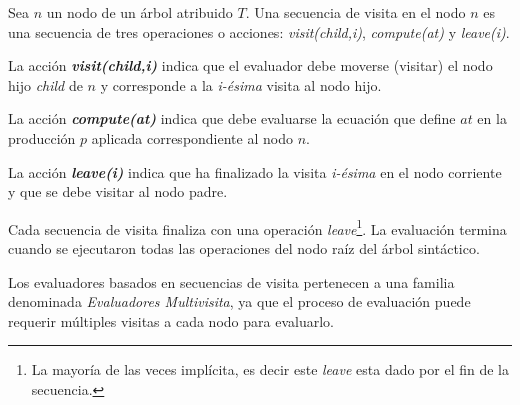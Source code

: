 \documentclass[runningheads,a4paper]{llncs}
\newcommand{\maggen}{\textbf{magGen}}
\begin{document}
Sea $n$ un nodo de un árbol atribuido $T$.
Una secuencia de visita en el nodo $n$ es una secuencia de tres operaciones o acciones: 
\emph{visit(child,i)}, \emph{compute(at)} y \emph{leave(i)}.

\begin{description}
\item La acción \emph{\textbf{visit(child,i)}} indica que el evaluador debe moverse (visitar) el nodo hijo \emph{child} de $n$ y corresponde a la \emph{i-ésima} visita al nodo hijo.

\item La acción \emph{\textbf{compute(at)}} indica que debe evaluarse la ecuación que define $at$ en la producción $p$ aplicada correspondiente al nodo $n$.

\item La acción \emph{\textbf{leave(i)}} indica que ha finalizado la visita \emph{i-ésima} en el nodo corriente y que se debe visitar al nodo padre.
\end{description}



Cada secuencia de visita finaliza con una operación \emph{leave}\footnote{La mayoría de las veces implícita, es decir este \emph{leave} esta dado por el fin de la secuencia.}. La evaluación termina cuando se ejecutaron todas las operaciones del nodo raíz del árbol sintáctico.

Los evaluadores basados en secuencias de visita pertenecen a una familia denominada \emph{Evaluadores Multivisita}, ya que el proceso de evaluación puede requerir múltiples visitas a cada nodo para evaluarlo.

\end{document}
